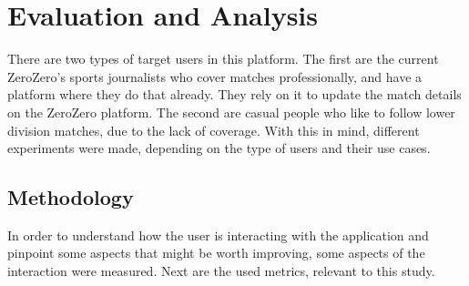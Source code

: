 \chapter{Evaluation and Analysis}\label{chap:evaluation-and-analysis}


There are two types of target users in this platform. The first are the current ZeroZero's sports journalists who cover matches professionally, and have a platform where they do that already. They rely on it to update the match details on the ZeroZero platform. The second are casual people who like to follow lower division matches, due to the lack of coverage. With this in mind, different experiments were made, depending on the type of users and their use cases.

\section{Methodology}

In order to understand how the user is interacting with the application and pinpoint some aspects that might be worth improving, some aspects of the interaction were measured. Next are the used metrics, relevant to this study.

